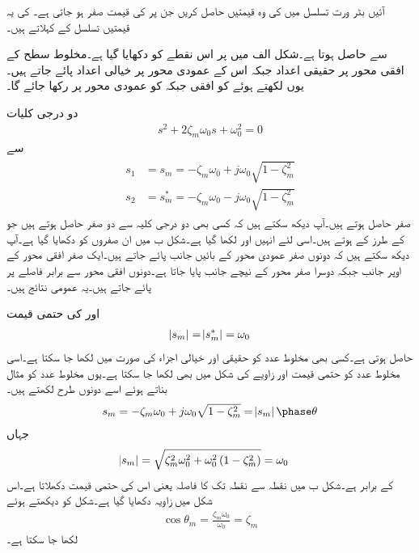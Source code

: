 آئیں بٹر ورت تسلسل میں  کی وہ قیمتیں حاصل کریں جن پر  کی قیمت صفر ہو جاتی  ہے۔ کی یہ قیمتیں تسلسل کے  کہلاتے ہیں۔

 سے  حاصل ہوتا ہے۔شکل  الف میں  پر اس نقطے کو دکھایا گیا ہے۔مخلوط سطح کے افقی محور پر حقیقی اعداد جبکہ اس کے عمودی محور پر خیالی اعداد پائے جاتے ہیں۔یوں  لکھتے ہوئے  کو افقی جبکہ  کو عمودی محور پر رکھا جائے گا۔

دو درجی کلیات
\begin{align}\label{مساوات_تعددی_ردعمل_دو_درجی_عمومی_جزو}
s^2+2 \zeta_m \omega_0 s +\omega_0^2=0
\end{align}
سے
\begin{gather}
\begin{aligned}
s_1&=s_m =-\zeta_m \omega_0 + j \omega_0 \sqrt{1-\zeta_m^2}\\
s_2&=s_m^* =-\zeta_m \omega_0 - j \omega_0 \sqrt{1-\zeta_m^2}
\end{aligned}
\end{gather}
صفر حاصل ہوتے ہیں۔آپ دیکھ سکتے ہیں کہ کسی بھی دو درجی کلیہ سے دو صفر حاصل ہوتے ہیں جو  کے طرز کے ہوتے ہیں۔اسی لئے انہیں  اور  لکھا گیا ہے۔شکل  ب میں ان صفروں کو دکھایا گیا ہے۔آپ دیکھ سکتے ہیں کہ دونوں صفر عمودی محور کے بائیں جانب پائے جاتے ہیں۔ایک صفر افقی محور کے اوپر جانب جبکہ دوسرا صفر محور کے نیچے   جانب پایا جاتا ہے۔دونوں افقی محور سے برابر فاصلے پر پائے جاتے ہیں۔یہ  عمومی نتائج ہیں۔

 اور  کی حتمی قیمت
\begin{align}
\abs{s_m}=\abs{s_m^*}=\omega_0
\end{align}
حاصل ہوتی ہے۔کسی بھی مخلوط عدد کو حقیقی اور خیالی اجزاء کی صورت میں لکھا جا سکتا ہے۔اسی مخلوط عدد کو حتمی قیمت اور زاویے کی شکل میں بھی لکھا جا سکتا ہے۔یوں  مخلوط عدد کو مثال بناتے ہوئے اسے دونوں طرح لکھتے ہیں۔
\begin{align}
s_m=-\zeta_m \omega_0 +j \omega_0 \sqrt{1-\zeta_m^2}= \abs {s_m} \phase \theta
\end{align}
جہاں
\begin{align}\label{مساوات_تعددی_ردعمل_صفر_حتمی_فاصلہ}
\abs{s_m}&=\sqrt{\zeta_m^2 \omega_0^2 +\omega_0^2\left(1 -\zeta_m^2\right)}=\omega_0
\end{align}
کے برابر ہے۔شکل  ب میں نقطہ   سے  نقطہ  تک کا فاصلہ  یعنی اس کی حتمی قیمت دکھلاتا ہے۔اس شکل میں زاویہ  دکھایا گیا ہے۔شکل کو دیکھتے ہوئے
\begin{align}\label{مساوات_تعددی_ردعمل_دھیماپن_کا_حصول}
\cos \theta_m=\frac{\zeta_m \omega_0}{\omega_0}=\zeta_m
\end{align}
لکھا جا سکتا ہے۔

